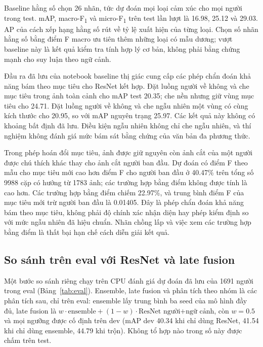 \documentclass[conference]{IEEEtran}
\newcommand{\ev}[2]{#2}
\newcommand{\mf}{macro-F\textsubscript{1}}
\newcommand{\mi}{micro-F\textsubscript{1}}
\begin{document}
Baseline hằng số chọn \ev{constant-k}{26} nhãn, tức dự đoán mọi loại cảm xúc cho mọi người trong test. mAP, \mf{} và \mi{} trên test lần lượt là \ev{constant-test-map}{16.98}, \ev{constant-test-macro_f1}{25.12} và \ev{constant-test-micro_f1}{29.03}. AP của cách xếp hạng hằng số rút về tỷ lệ xuất hiện của từng loại. Chọn số nhãn hằng số bằng điểm F macro ưu tiên thêm những loại có mẫu dương; vượt baseline này là kết quả kiểm tra tính hợp lý cơ bản, không phải bằng chứng mạnh cho suy luận theo ngữ cảnh.

Đầu ra đã lưu của notebook baseline thị giác cung cấp các phép chẩn đoán khả năng bám theo mục tiêu cho ResNet kết hợp. Đặt luồng người về không và che mục tiêu trong ảnh toàn cảnh cho mAP test \ev{region-delta_person-map}{20.35}; che nền nhưng giữ vùng mục tiêu cho \ev{region-delta_context-map}{24.71}. Đặt luồng người về không và che ngẫu nhiên một vùng có cùng kích thước cho \ev{region-delta_random-map}{20.95}, so với mAP nguyên trạng \ev{resnet-person_context-test-map}{25.97}. Các kết quả này không có khoảng bất định đã lưu. Điều kiện ngẫu nhiên không chỉ che ngẫu nhiên, và thí nghiệm không đánh giá mức bám sát bằng chứng của văn bản đa phương thức.

Trong phép hoán đổi mục tiêu, ảnh được giữ nguyên còn ảnh cắt của một người được chú thích khác thay cho ảnh cắt người ban đầu. Dự đoán có điểm F theo mẫu cho mục tiêu mới cao hơn điểm F cho người ban đầu ở \ev{swap-swap_accuracy}{40.47}\% trên tổng số \ev{swap-num_pairs}{9988} cặp có hướng từ \ev{swap-num_images}{1783} ảnh; các trường hợp bằng điểm không được tính là cao hơn. Các trường hợp bằng điểm chiếm \ev{swap-tie_rate}{22.97}\%, và trung bình điểm F của mục tiêu mới trừ người ban đầu là \ev{swap-mean_target_minus_source_f1}{0.01405}. Đây là phép chẩn đoán khả năng bám theo mục tiêu, không phải độ chính xác nhận diện hay phép kiểm định so với mức ngẫu nhiên đã hiệu chuẩn. Nhãn chồng lấp và việc xem các trường hợp bằng điểm là thất bại hạn chế cách diễn giải kết quả.

\subsection{So sánh trên eval với ResNet và late fusion}\label{sec:eval}
Một bước so sánh riêng chạy trên CPU đánh giá dự đoán đã lưu của 1691 người trong eval (Bảng~\ref{tab:eval}). Ensemble, late fusion và phân tích theo nhóm là các phân tích sau, chỉ trên eval: ensemble lấy trung bình ba seed của mô hình đầy đủ, late fusion là $w\cdot\text{ensemble}+(1-w)\cdot\text{ResNet người+ngữ cảnh}$, còn $w=0.5$ và mọi ngưỡng được cố định trên dev (mAP dev 40.34 khi chỉ dùng ResNet, 41.54 khi chỉ dùng ensemble, 44.79 khi trộn). Không tổ hợp nào trong số này được chấm trên test.
\end{document}

